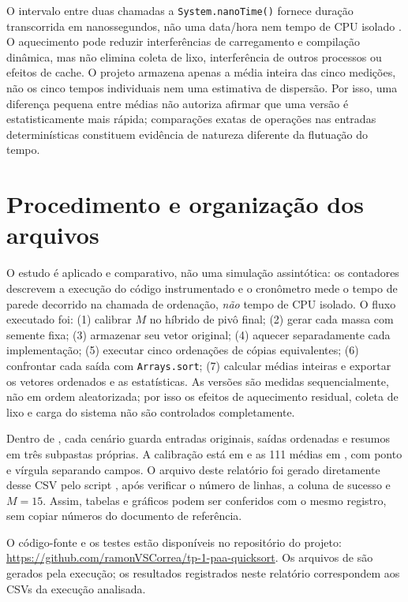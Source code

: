 O intervalo entre duas chamadas a \texttt{System.nanoTime()} fornece duração transcorrida em nanossegundos, não uma data/hora nem tempo de CPU isolado \cite{oracle2021}. O aquecimento pode reduzir interferências de carregamento e compilação dinâmica, mas não elimina coleta de lixo, interferência de outros processos ou efeitos de cache. O projeto armazena apenas a média inteira das cinco medições, não os cinco tempos individuais nem uma estimativa de dispersão. Por isso, uma diferença pequena entre médias não autoriza afirmar que uma versão é estatisticamente mais rápida; comparações exatas de operações nas entradas determinísticas constituem evidência de natureza diferente da flutuação do tempo.

\section{Procedimento e organização dos arquivos}

O estudo é aplicado e comparativo, não uma simulação assintótica: os contadores descrevem a execução do código instrumentado e o cronômetro mede o tempo de parede decorrido na chamada de ordenação, \emph{não} tempo de CPU isolado. O fluxo executado foi: (1) calibrar $M$ no híbrido de pivô final; (2) gerar cada massa com semente fixa; (3) armazenar seu vetor original; (4) aquecer separadamente cada implementação; (5) executar cinco ordenações de cópias equivalentes; (6) confrontar cada saída com \texttt{Arrays.sort}; (7) calcular médias inteiras e exportar os vetores ordenados e as estatísticas. As versões são medidas sequencialmente, não em ordem aleatorizada; por isso os efeitos de aquecimento residual, coleta de lixo e carga do sistema não são controlados completamente.

Dentro de , cada cenário guarda entradas originais, saídas ordenadas e resumos em três subpastas próprias. A calibração está em  e as 111 médias em , com ponto e vírgula separando campos. O arquivo  deste relatório foi gerado diretamente desse CSV pelo script , após verificar o número de linhas, a coluna de sucesso e $M=15$. Assim, tabelas e gráficos podem ser conferidos com o mesmo registro, sem copiar números do documento de referência.

O código-fonte e os testes estão disponíveis no repositório do projeto: \url{https://github.com/ramonVSCorrea/tp-1-paa-quicksort}. Os arquivos de  são gerados pela execução; os resultados registrados neste relatório correspondem aos CSVs da execução analisada.

